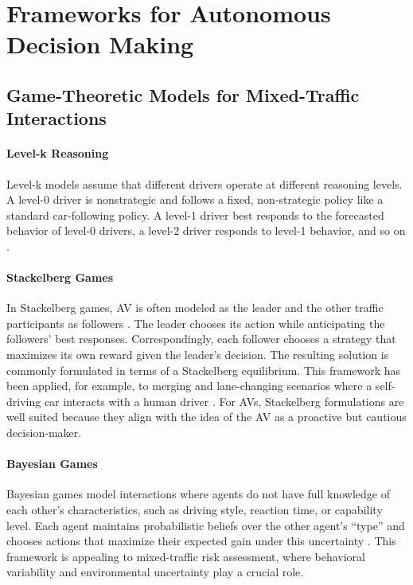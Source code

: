 \section{Frameworks for Autonomous Decision Making}

\subsection{Game-Theoretic Models for Mixed-Traffic Interactions}
\paragraph{Level-k Reasoning}
Level-k models assume that different drivers operate at different reasoning levels. A level-0 driver is nonstrategic
and follows a fixed, non-strategic policy like a standard car-following policy. A level-1 driver best
responds to the forecasted behavior of level-0 drivers, a level-2 driver responds to level-1 behavior, and
so on \cite{9147369}.
\paragraph{Stackelberg Games}
In Stackelberg games, \ac{AV} is often modeled as the leader and the other traffic participants as followers \cite{niu2023stackelbergdrivermodelcontinual}. The leader chooses
its action while anticipating the followers’ best responses. Correspondingly, each follower chooses a strategy
that maximizes its own reward given the leader’s decision. The resulting solution is commonly formulated in terms of a Stackelberg
equilibrium. This framework has been applied, for example, to merging and lane-changing scenarios
where a self-driving car interacts with a human driver \cite{electronics10080894}. For \acp{AV}, Stackelberg formulations are well
suited because they align with the idea of the \ac{AV} as a proactive but cautious decision-maker.
\paragraph{Bayesian Games}
Bayesian games model interactions where agents do not have full knowledge of each other’s characteristics,
such as driving style, reaction time, or capability level. Each agent maintains probabilistic
beliefs over the other agent’s “type” and chooses actions that maximize their expected gain under this uncertainty
\cite{huang2024integrateddecisionmakingtrajectory}. This framework is appealing to mixed-traffic risk assessment, where behavioral variability
and environmental uncertainty play a crucial role.

